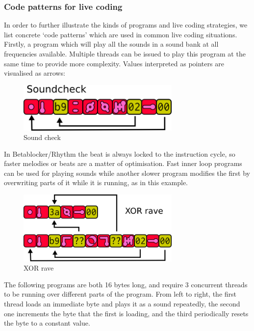 \documentclass[letterpaper, 12pt]{article}
\begin{document}
\subsubsection{Code patterns for live coding}
\label{ssub:code_patterns_for_livecoding}

In order to further illustrate the kinds of programs and live coding strategies, we list concrete `code patterns' which are used in common live coding situations.
Firstly, a program which will play all the sounds in a sound bank at all frequencies available.
Multiple threads can be issued to play this program at the same time to provide more complexity.
Values interpreted as pointers are visualised as arrows:

\begin{figure}[H]
	\centering
		\includegraphics[width=8cm]{bbds-sndchk1}
	\caption{Sound check}
	\label{fig:fig_bbds-sndchk1}
\end{figure}

In Betablocker/Rhythm the beat is always locked to the instruction cycle, so faster melodies or beats are a matter of optimisation. Fast inner loop programs can be used for playing sounds while another slower program modifies the first by overwriting parts of it while it is running, as in this example.

\begin{figure}[H]
	\centering
		\includegraphics[width=8cm]{bbds-xorrave}
	\caption{XOR rave}
	\label{fig:fig_bbds-xorrave}
\end{figure}

The following programs are both 16 bytes long, and require 3 concurrent threads to be running over different parts of the program. From left to right, the first thread loads an immediate byte and plays it as a sound repeatedly, the second one increments the byte that the first is loading, and the third periodically resets the byte to a constant value.
\end{document}
